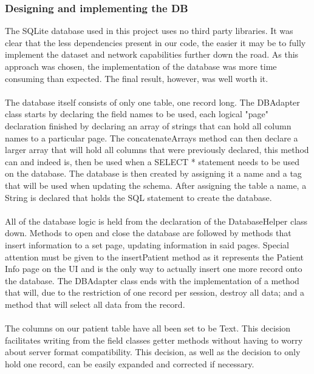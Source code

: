 \documentclass[12pt,a4paper,oneside,titlepage]{article}
\begin{document}
\subsubsection{Designing and implementing the DB}
The SQLite database used in this project uses no third party libraries. It was clear that the less dependencies present in our code, the easier it may be to fully implement the dataset and network capabilities further down the road. As this approach was chosen, the implementation of the database was more time consuming than expected. The final result, however, was well worth it.
\\  \\
The database itself consists of only one table, one record long. The DBAdapter class starts by declaring the field names to be used, each logical "page" declaration finished by declaring an array of strings that can hold all column names to a particular page. The concatenateArrays method can then declare a larger array that will hold all columns that were previously declared, this method can and indeed is, then be used when a SELECT * statement needs to be used on the database. The database is then created by assigning it a name and a tag that will be used when updating the schema. After assigning the table a name, a String is declared that holds the SQL statement to create the database.
\\ \\
All of the database logic is held from the declaration of the DatabaseHelper class down. Methods to open and close the database are followed by methods that insert information to a set page, updating information in said pages. Special attention must be given to the insertPatient method as it represents the Patient Info page on the UI and is the only way to actually insert one more record onto the database. The DBAdapter class ends with the implementation of a method that will, due to the restriction of one record per session, destroy all data; and a method that will select all data from the record.
\\ \\
The columns on our patient table have all been set to be Text. This decision facilitates writing from the field classes getter methods without having to worry about server format compatibility. This decision, as well as the decision to only hold one record, can be easily expanded and corrected if necessary.

\newpage
\end{document}
